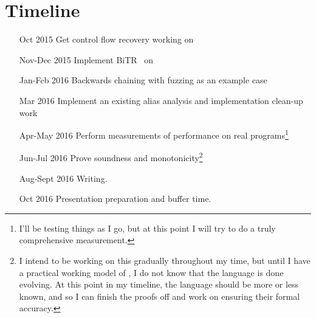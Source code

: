 \section{Timeline}
\begin{itemize}
  \item[Oct 2015] Get control flow recovery working on \sysname
  \item[Nov-Dec 2015] Implement BiTR~\cite{bitr} on \sysname
  \item[Jan-Feb 2016] Backwards chaining with fuzzing as an example case
  \item[Mar 2016] Implement an existing alias analysis and implementation clean-up work
  \item[Apr-May 2016] Perform measurements of performance on real programs\footnote{
      I'll be testing things as I go, but at this point I will try to do a truly comprehensive measurement.
    }
  \item[Jun-Jul 2016] Prove soundness and monotonicity\footnote{
      I intend to be working on this gradually throughout my time, but until I have a practical working model of \sysname, I do not know that the language is done evolving.
      At this point in my timeline, the language should be more or less known, and so I can finish the proofs off and work on ensuring their formal accuracy.
    }
  \item[Aug-Sept 2016] Writing.
  \item[Oct 2016] Presentation preparation and buffer time.
\end{itemize}
